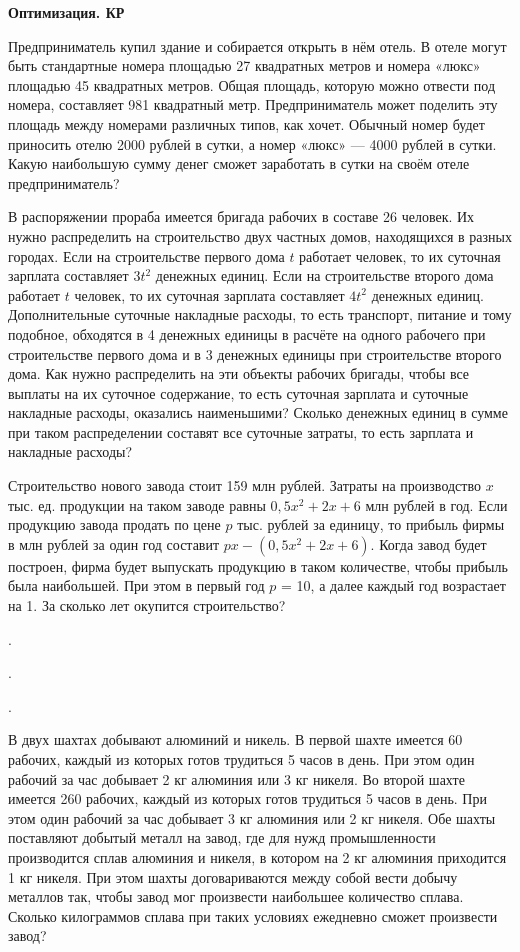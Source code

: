 \centerline{\bf \Huge Оптимизация. КР}
\centerline{\bf \Huge }


 Предприниматель купил здание и собирается открыть в нём отель. В отеле могут быть
стандартные номера площадью 27 квадратных метров и номера «люкс» площадью 45
квадратных метров. Общая площадь, которую можно отвести под номера, составляет 981
квадратный метр. Предприниматель может поделить эту площадь между номерами различных
типов, как хочет. Обычный номер будет приносить отелю 2000 рублей в сутки, а номер «люкс» —
4000 рублей в сутки. Какую наибольшую сумму денег сможет заработать в сутки на своём отеле
предприниматель?

 В распоряжении прораба имеется бригада рабочих в составе 26 человек. Их нужно распределить
на строительство двух частных домов, находящихся в разных городах.
Если на строительстве первого дома $t$ работает человек, то их суточная зарплата составляет $3t^2$
денежных единиц. Если на строительстве второго дома работает $t$ человек, то их суточная
зарплата составляет $4t^2$ денежных единиц. Дополнительные суточные накладные расходы, то
есть транспорт, питание и тому подобное, обходятся в 4 денежных единицы в расчёте на одного
рабочего при строительстве первого дома и в 3 денежных единицы при строительстве второго
дома.
Как нужно распределить на эти объекты рабочих бригады, чтобы все выплаты на их суточное
содержание, то есть суточная зарплата и суточные накладные расходы, оказались
наименьшими? Сколько денежных единиц в сумме при таком распределении составят все
суточные затраты, то есть зарплата и накладные расходы?

 Строительство нового завода стоит 159 млн рублей. Затраты на производство $x$ тыс. ед.
продукции на таком заводе равны $0,5x^2 + 2x + 6$ млн рублей в год. Если продукцию завода
продать по цене $p$ тыс. рублей за единицу, то прибыль фирмы в млн рублей за один год составит
$px - (0,5x^2 + 2x + 6)$. Когда завод будет построен, фирма будет выпускать продукцию в таком
количестве, чтобы прибыль была наибольшей. При этом в первый год $p$ = 10, а далее каждый
год возрастает на 1. За сколько лет окупится строительство?

.

.

.


 В двух шахтах добывают алюминий и никель. В первой шахте имеется 60 рабочих, каждый
из которых готов трудиться 5 часов в день. При этом один рабочий за час добывает 2 кг
алюминия или 3 кг никеля. Во второй шахте имеется 260 рабочих, каждый из которых готов
трудиться 5 часов в день. При этом один рабочий за час добывает 3 кг алюминия или 2 кг
никеля.
Обе шахты поставляют добытый металл на завод, где для нужд промышленности производится сплав алюминия и никеля, в котором на 2 кг алюминия приходится 1 кг никеля. При этом
шахты договариваются между собой вести добычу металлов так, чтобы завод мог произвести
наибольшее количество сплава. Сколько килограммов сплава при таких условиях ежедневно
сможет произвести завод?